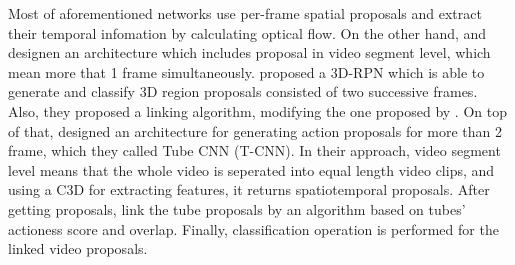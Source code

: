Most of aforementioned networks use per-frame spatial proposals and extract their temporal infomation by calculating optical flow. On the other hand,  \cite{DBLP:journals/corr/SahaSC17} and  \cite{DBLP:journals/corr/HouCS17} designen an architecture which includes proposal in video segment level, which mean  more that 1 frame simultaneously. \cite{DBLP:journals/corr/SahaSC17} proposed a 3D-RPN which
is able to generate and classify 3D region proposals consisted of two successive frames. Also, they proposed a linking algorithm, modifying the one proposed by \cite{DBLP:journals/corr/SahaSSTC16}.
On top of that, \cite{DBLP:journals/corr/HouCS17} designed an architecture for generating action proposals for more than 2 frame, which they called Tube CNN (T-CNN). In their approach, video segment level means that the whole video is seperated into equal length video clips, and
using a C3D for extracting features, it returns spatiotemporal proposals. After getting proposals, \cite{DBLP:journals/corr/HouCS17} link the tube proposals by an algorithm based on tubes'
actioness score and overlap. Finally, classification operation is performed for the linked video proposals.


% 